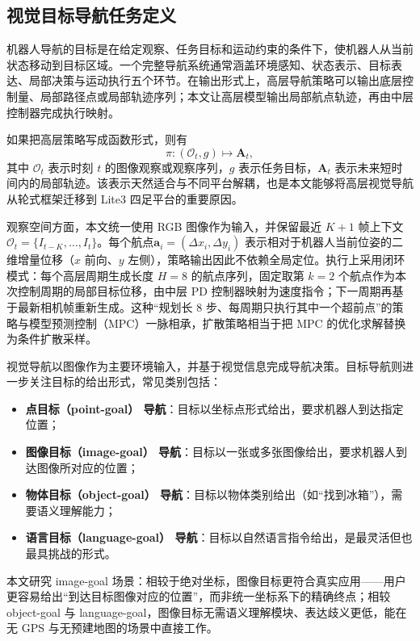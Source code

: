 \subsection{视觉目标导航任务定义}

机器人导航的目标是在给定观察、任务目标和运动约束的条件下，使机器人从当前状态移动到目标区域。一个完整导航系统通常涵盖环境感知、状态表示、目标表达、局部决策与运动执行五个环节\cite{thrun2005probabilistic,anderson2018evaluation}。在输出形式上，高层导航策略可以输出底层控制量、局部路径点或局部轨迹序列；本文让高层模型输出局部航点轨迹，再由中层控制器完成执行映射。

如果把高层策略写成函数形式，则有
\begin{equation}
\pi : (\mathcal{O}_t, g) \mapsto \mathbf{A}_t ,
\end{equation}
其中 $\mathcal{O}_t$ 表示时刻 $t$ 的图像观察或观察序列，$g$ 表示任务目标，$\mathbf{A}_t$ 表示未来短时间内的局部轨迹。该表示天然适合与不同平台解耦，也是本文能够将高层视觉导航从轮式框架迁移到 Lite3 四足平台的重要原因。

观察空间方面，本文统一使用 RGB 图像作为输入，并保留最近 $K+1$ 帧上下文 $\mathcal{O}_t = \{I_{t-K}, \ldots, I_t\}$。每个航点$\mathbf{a}_i = (\Delta x_i, \Delta y_i)$ 表示相对于机器人当前位姿的二维增量位移（$x$ 前向、$y$ 左侧），策略输出因此不依赖全局定位。执行上采用闭环模式：每个高层周期生成长度 $H=8$ 的航点序列，固定取第 $k=2$ 个航点作为本次控制周期的局部目标位移，由中层 PD 控制器映射为速度指令；下一周期再基于最新相机帧重新生成。这种``规划长 8 步、每周期只执行其中一个超前点''的策略与模型预测控制（MPC）一脉相承，扩散策略相当于把 MPC 的优化求解替换为条件扩散采样。

视觉导航以图像作为主要环境输入，并基于视觉信息完成导航决策\cite{zhu2017targetdriven,anderson2018evaluation}。目标导航则进一步关注目标的给出形式，常见类别包括：
\begin{itemize}
    \item \textbf{点目标（point-goal） 导航}\cite{ddppo2020}：目标以坐标点形式给出，要求机器人到达指定位置；
    \item \textbf{图像目标（image-goal） 导航}：目标以一张或多张图像给出，要求机器人到达图像所对应的位置；
    \item \textbf{物体目标（object-goal） 导航}：目标以物体类别给出（如``找到冰箱''），需要语义理解能力；
    \item \textbf{语言目标（language-goal） 导航}：目标以自然语言指令给出，是最灵活但也最具挑战的形式。
\end{itemize}
本文研究 image-goal 场景：相较于绝对坐标，图像目标更符合真实应用——用户更容易给出``到达目标图像对应的位置''，而非统一坐标系下的精确终点；相较 object-goal 与 language-goal，图像目标无需语义理解模块、表达歧义更低，能在无 GPS 与无预建地图的场景中直接工作。

